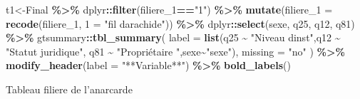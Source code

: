 \documentclass[
]{article}
\newenvironment{Shaded}{\begin{snugshade}}{\end{snugshade}}
\newcommand{\AttributeTok}[1]{\textcolor[rgb]{0.13,0.29,0.53}{#1}}
\newcommand{\FunctionTok}[1]{\textcolor[rgb]{0.13,0.29,0.53}{\textbf{#1}}}
\newcommand{\NormalTok}[1]{#1}
\newcommand{\OtherTok}[1]{\textcolor[rgb]{0.56,0.35,0.01}{#1}}
\newcommand{\SpecialCharTok}[1]{\textcolor[rgb]{0.81,0.36,0.00}{\textbf{#1}}}
\newcommand{\StringTok}[1]{\textcolor[rgb]{0.31,0.60,0.02}{#1}}
\begin{document}
\begin{Shaded}
\begin{Highlighting}[]
\NormalTok{t1}\OtherTok{\textless{}{-}}\NormalTok{Final }\SpecialCharTok{\%\textgreater{}\%}
\NormalTok{  dplyr}\SpecialCharTok{::}\FunctionTok{filter}\NormalTok{(filiere\_1}\SpecialCharTok{==}\StringTok{"1"}\NormalTok{) }\SpecialCharTok{\%\textgreater{}\%} 
  \FunctionTok{mutate}\NormalTok{(}\AttributeTok{filiere\_1 =} \FunctionTok{recode}\NormalTok{(filiere\_1, }\StringTok{\textasciigrave{}}\AttributeTok{1}\StringTok{\textasciigrave{}} \OtherTok{=} \StringTok{"fil d\textquotesingle{}arachide"}\NormalTok{)) }\SpecialCharTok{\%\textgreater{}\%}
\NormalTok{  dplyr}\SpecialCharTok{::}\FunctionTok{select}\NormalTok{(sexe, q25, q12, q81) }\SpecialCharTok{\%\textgreater{}\%}
\NormalTok{        gtsummary}\SpecialCharTok{::}\FunctionTok{tbl\_summary}\NormalTok{(}
      \AttributeTok{label =} \FunctionTok{list}\NormalTok{(q25 }\SpecialCharTok{\textasciitilde{}} \StringTok{"Niveau d\textquotesingle{}inst"}\NormalTok{,q12 }\SpecialCharTok{\textasciitilde{}} \StringTok{"Statut juridique"}\NormalTok{,}
\NormalTok{            q81 }\SpecialCharTok{\textasciitilde{}} \StringTok{"Propriétaire "}\NormalTok{,sexe}\SpecialCharTok{\textasciitilde{}}\StringTok{"sexe"}\NormalTok{),}
          \AttributeTok{missing =} \StringTok{"no"}
\NormalTok{        ) }\SpecialCharTok{\%\textgreater{}\%} \FunctionTok{modify\_header}\NormalTok{(}\AttributeTok{label =} \StringTok{"**Variable**"}\NormalTok{) }\SpecialCharTok{\%\textgreater{}\%} 
  \FunctionTok{bold\_labels}\NormalTok{()}
\end{Highlighting}
\end{Shaded}

Tableau filiere de l'anarcarde
\end{document}
